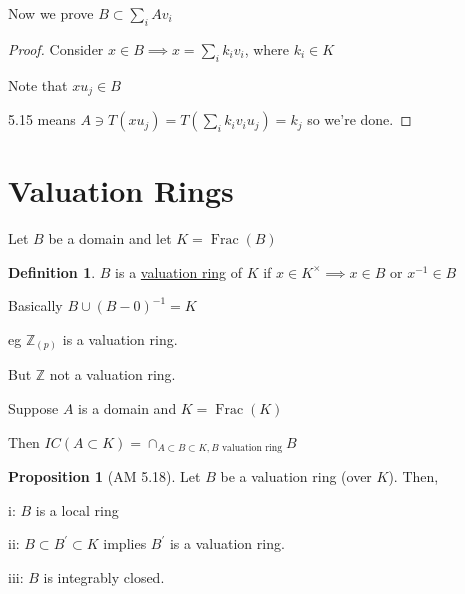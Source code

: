 \documentclass{article}
\theoremstyle{definition}
\newtheorem{definition}{Definition}
\newtheorem{proposition}{Proposition}
\newcommand{\Frac}{\operatorname{Frac}}
\begin{document}
Now we prove \(B \subset \sum_{i} Av_i\) 

\begin{proof}
    Consider \(x\in B \implies x = \sum_{i} k_i v_i\), where \(k_i\in K\) 
    
    Note that \(x u_j \in B\) 

    5.15 means \(A\ni T(x u_j)=T(\sum_i k_i v_i u_j)=k_j\) so we're done. 
\end{proof}

\section*{Valuation Rings}

Let \(B\) be a domain and let \(K = \Frac(B)\) 

\begin{definition}
    \(B\) is a \underline{valuation ring} of \(K\) if \(x\in K^\times \implies x\in B\) or \(x ^{-1} \in B\)  
\end{definition}

Basically \(B \cup (B-0)^{-1} = K\) 

eg \(\mathbb{Z}_{(p)}\) is a valuation ring.

But \(\mathbb{Z}\) not a valuation ring.

Suppose \(A\) is a domain and \(K = \Frac(K)\) 

Then \(IC(A \subset K) = \cap_{A \subset B \subset K, B \text{ valuation ring}} B\) 

\begin{proposition}
    [AM 5.18]

    Let \(B\) be a valuation ring (over \(K\)). Then,

    i: \(B\) is a local ring

    ii: \(B \subset B^{\prime} \subset K\) implies \(B^{\prime}\) is a valuation ring.
    
    iii: \(B\) is integrably closed.

\end{proposition}
\end{document}

